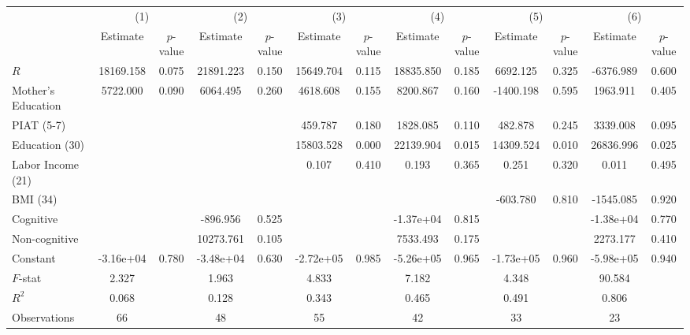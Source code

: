 
\begin{tabular}{lcccccccccccc} \toprule
 & \multicolumn{2}{c}{(1)}  &  \multicolumn{2}{c}{(2)}  &  \multicolumn{2}{c}{(3)}  &  \multicolumn{2}{c}{(4)}  & \multicolumn{2}{c}{(5)} & \multicolumn{2}{c}{(6)} \\  
 & Estimate & $p$-value & Estimate & $p$-value & Estimate & $p$-value & Estimate & $p$-value & Estimate & $p$-value & Estimate & $p$-value \\ \midrule
$R$ & 18169.158 &     0.075 & 21891.223 &     0.150 & 15649.704 &     0.115 & 18835.850 &     0.185 &  6692.125 &     0.325 & -6376.989 &     0.600 \\  
Mother's Education &  5722.000 &     0.090 &  6064.495 &     0.260 &  4618.608 &     0.155 &  8200.867 &     0.160 & -1400.198 &     0.595 &  1963.911 &     0.405 \\  
PIAT (5-7) &         &         &         &         &   459.787 &     0.180 &  1828.085 &     0.110 &   482.878 &     0.245 &  3339.008 &     0.095 \\  
Education (30) &         &         &         &         & 15803.528 &     0.000 & 22139.904 &     0.015 & 14309.524 &     0.010 & 26836.996 &     0.025 \\  
Labor Income (21) &         &         &         &         &     0.107 &     0.410 &     0.193 &     0.365 &     0.251 &     0.320 &     0.011 &     0.495 \\  
BMI (34) &         &         &         &         &         &         &         &         &  -603.780 &     0.810 & -1545.085 &     0.920 \\  
Cognitive &         &         &  -896.956 &     0.525 &         &         & -1.37e+04 &     0.815 &         &         & -1.38e+04 &     0.770 \\  
Non-cognitive &         &         & 10273.761 &     0.105 &         &         &  7533.493 &     0.175 &         &         &  2273.177 &     0.410 \\  
Constant & -3.16e+04 &     0.780 & -3.48e+04 &     0.630 & -2.72e+05 &     0.985 & -5.26e+05 &     0.965 & -1.73e+05 &     0.960 & -5.98e+05 &     0.940 \\  \midrule
$F$-stat &     2.327 &         &     1.963 &         &     4.833 &         &     7.182 &         &     4.348 &         &    90.584 &         \\  
$R^2$ &     0.068 &         &     0.128 &         &     0.343 &         &     0.465 &         &     0.491 &         &     0.806 &         \\  
Observations &    66 &         &    48 &         &    55 &         &    42 &         &    33 &         &    23 &         \\  
\bottomrule \end{tabular}

